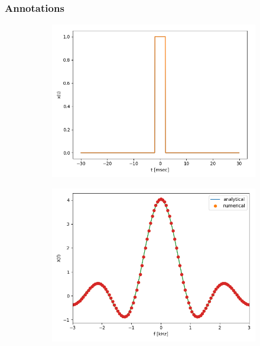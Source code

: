 \documentclass[9pt]{beamer}
\begin{document}
	\begin{frame}
	\frametitle{Annotations}
	
	\begin{figure}
		\begin{subfigure}{0.49\linewidth}
			\includegraphics[width=\linewidth]{squarepulse}
		\end{subfigure}
		\begin{subfigure}{0.49\linewidth}
			\includegraphics[width=\linewidth]{compsinc}
		\end{subfigure}
	\end{figure}
	\end{frame}
\end{document}
